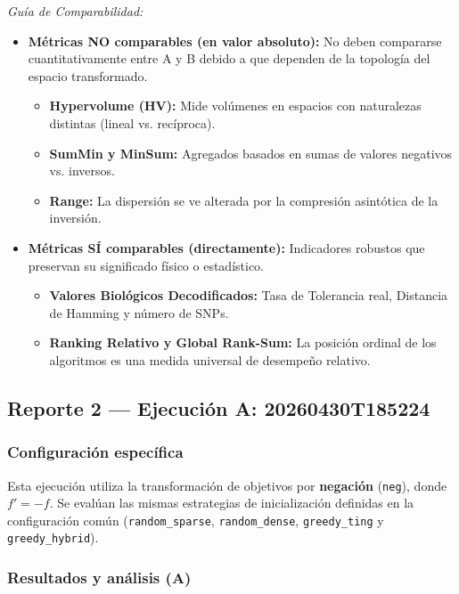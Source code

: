 \documentclass[a4paper,10pt]{article}
\begin{document}
\textit{Guía de Comparabilidad:}
\begin{itemize}
    \item \textbf{Métricas NO comparables (en valor absoluto):} No deben compararse cuantitativamente entre A y B debido a que dependen de la topología del espacio transformado.
    \begin{itemize}
        \item \textbf{Hypervolume (HV):} Mide volúmenes en espacios con naturalezas distintas (lineal vs. recíproca).
        \item \textbf{SumMin y MinSum:} Agregados basados en sumas de valores negativos vs. inversos.
        \item \textbf{Range:} La dispersión se ve alterada por la compresión asintótica de la inversión.
    \end{itemize}
    \item \textbf{Métricas SÍ comparables (directamente):} Indicadores robustos que preservan su significado físico o estadístico.
    \begin{itemize}
        \item \textbf{Valores Biológicos Decodificados:} Tasa de Tolerancia real, Distancia de Hamming y número de SNPs.
        \item \textbf{Ranking Relativo y Global Rank-Sum:} La posición ordinal de los algoritmos es una medida universal de desempeño relativo.
    \end{itemize}
\end{itemize}

\subsection{Reporte 2 — Ejecución A: 20260430T185224}
\label{sec:reporte2}

\subsubsection{Configuración específica}
Esta ejecución utiliza la transformación de objetivos por \textbf{negación} (\texttt{neg}), donde $f' = -f$. Se evalúan las mismas estrategias de inicialización definidas en la configuración común (\texttt{random\_sparse}, \texttt{random\_dense}, \texttt{greedy\_ting} y \texttt{greedy\_hybrid}).

\subsubsection{Resultados y análisis (A)}
\end{document}
